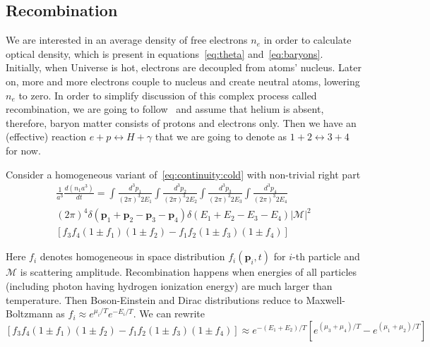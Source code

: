 \documentclass[12pt]{extarticle}
\numberwithin{problem}{section}
\numberwithin{theorem}{section}
\begin{document}
	\subsection{Recombination}
	We are interested in an average density of free electrons $n_e$ in order to calculate optical density, which is present in equations~\ref{eq:theta} and~\ref{eq:baryons}. Initially, when Universe is hot, electrons are decoupled from atoms' nucleus. Later on, more and more electrons couple to nucleus and create neutral atoms, lowering $n_e$ to zero. In order to simplify discussion of this complex process called recombination, we are going to follow~\cite{dodelson:2003} and assume that helium is absent, therefore, baryon matter consists of protons and electrons only. Then we have an (effective) reaction $e + p\leftrightarrow H + \gamma$ that we are going to denote as $1 + 2\leftrightarrow 3 + 4$ for now.
	
	Consider a homogeneous variant of~\ref{eq:continuity:cold} with non-trivial right part
	\begin{multline}
		\label{eq:reaction:complete}
		\frac{1}{a^3}\frac{d(n_1a^3)}{dt} = \int\frac{d^3p_1}{(2\pi)^3 2E_1}\int\frac{d^3p_2}{(2\pi)^3 2E_2}\int\frac{d^3p_3}{(2\pi)^3 2E_3}\int\frac{d^3p_4}{(2\pi)^3 2E_4}\\
		(2\pi)^4\delta(\mathbf{p}_1 + \mathbf{p}_2 - \mathbf{p}_3 - \mathbf{p}_4)\delta(E_1 + E_2 - E_3 - E_4)|\mathcal{M}|^2\\
		\left[f_3f_4(1\pm f_1)(1\pm f_2) - f_1f_2(1\pm f_3)(1\pm f_4)\right]
	\end{multline}

	Here $f_i$ denotes homogeneous in space distribution $f_i(\mathbf{p}_i, t)$ for $i$-th particle and $\mathcal{M}$ is scattering amplitude. Recombination happens when energies of all particles (including photon having hydrogen ionization energy) are much larger than temperature. Then Boson-Einstein and Dirac distributions reduce to Maxwell-Boltzmann as $f_i\approx e^{\mu_i / T}e^{-E_i / T}$. We can rewrite
	\begin{equation}
		\left[f_3f_4(1\pm f_1)(1\pm f_2) - f_1f_2(1\pm f_3)(1\pm f_4)\right] \approx e^{-(E_1 + E_2) / T}\left[e^{(\mu_3 + \mu_4) / T} - e^{(\mu_1 + \mu_2) / T}\right]
	\end{equation}
\end{document}
